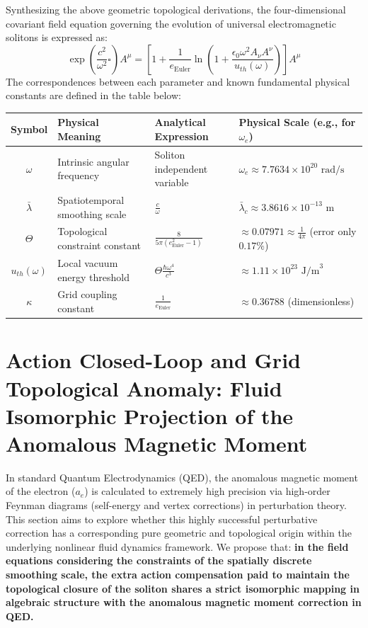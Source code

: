 \documentclass[12pt, a4paper]{article}
\begin{document}
Synthesizing the above geometric topological derivations, the four-dimensional covariant field equation governing the evolution of universal electromagnetic solitons is expressed as:
\begin{equation}
\exp\left( \frac{c^2}{\omega^2} \square \right) A^\mu = \left[ 1 + \frac{1}{e_{\text{Euler}}} \ln \left( 1 + \frac{\epsilon_0 \omega^2 A_\nu A^\nu}{u_{th}(\omega)} \right) \right] A^\mu
\end{equation}
The correspondences between each parameter and known fundamental physical constants are defined in the table below:


\begin{table}[h!]
\centering
\begin{tabular}{|c|p{5cm}|p{3.5cm}|p{4.5cm}|}
\hline
\textbf{Symbol} & \textbf{Physical Meaning} & \textbf{Analytical Expression} & \textbf{Physical Scale (e.g., for $\omega_e$)} \\ \hline
$\omega$ & Intrinsic angular frequency & Soliton independent variable & $\omega_e \approx 7.7634 \times 10^{20} \text{ rad/s}$ \\ \hline
$\bar{\lambda}$ & Spatiotemporal smoothing scale & $\frac{c}{\omega}$ & $\bar{\lambda}_c \approx 3.8616 \times 10^{-13} \text{ m}$ \\ \hline
$\Theta$ & Topological constraint constant & $\frac{8}{5\pi (e_{\text{Euler}}^2 - 1)}$ & $\approx 0.07971 \approx \frac{1}{4\pi}$ (error only $0.17\%$) \\ \hline
$u_{th}(\omega)$ & Local vacuum energy threshold & $\Theta \frac{\hbar \omega^4}{c^3}$ & $\approx 1.11 \times 10^{23} \text{ J/m}^3$ \\ \hline
$\kappa$ & Grid coupling constant & $\frac{1}{e_{\text{Euler}}}$ & $\approx 0.36788$ (dimensionless) \\ \hline
\end{tabular}
\end{table}


\section{Action Closed-Loop and Grid Topological Anomaly: Fluid Isomorphic Projection of the Anomalous Magnetic Moment}

In standard Quantum Electrodynamics (QED), the anomalous magnetic moment of the electron ($a_e$) is calculated to extremely high precision via high-order Feynman diagrams (self-energy and vertex corrections) in perturbation theory. This section aims to explore whether this highly successful perturbative correction has a corresponding pure geometric and topological origin within the underlying nonlinear fluid dynamics framework. We propose that: \textbf{in the field equations considering the constraints of the spatially discrete smoothing scale, the extra action compensation paid to maintain the topological closure of the soliton shares a strict isomorphic mapping in algebraic structure with the anomalous magnetic moment correction in QED.}
\end{document}
